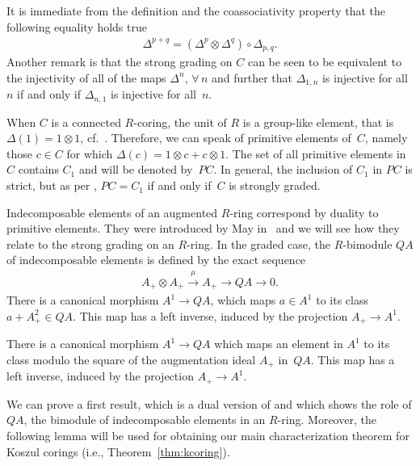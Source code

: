 \documentclass[11pt]{article}
\newcommand\ot{\otimes}
\renewcommand{\^}[1]{\mbox{$^{\left( #1 \right)}$}}
\renewcommand{\_}[1]{\mbox{$_{\left( #1 \right)}$}}
\newcommand\xrar{\xrightarrow}
\numberwithin{equation}{section}
\begin{document}
It is immediate from the def\/inition and the coassociativity property that the following equality holds true
\begin{gather*}
	\Delta^{p+q} = (\Delta^p \ot \Delta^q) \circ \Delta_{p,q}.
\end{gather*}
Another remark is that the strong grading on $C$ can be seen to be equivalent to the injectivity of all of the maps $\Delta^n$, $\forall\, n$ and further that $\Delta_{1,n}$ is injective for all $n$ if and only if $\Delta_{n,1}$ is injective for all~$n$.

When $C$ is a connected $R$-coring, the unit of $R$ is a group-like element, that is $\Delta(1) = 1 \ot 1$, cf.~\cite{jps}. Therefore, we can speak of primitive elements of~$C$, namely those $c \in C$ for which $\Delta(c) = 1 \ot c + c \ot 1$. The set of all primitive elements in $C$ contains $C_1$ and will be denoted by~$PC$. In general, the inclusion of $C_1$ in $PC$ is strict, but as per \cite[Lemma~1.4]{mst}, $PC = C_1$ if and only if~$C$ is strongly graded.

Indecomposable elements of an augmented $R$-ring correspond by duality to primitive elements. They were introduced by May in~\cite{may} and we will see how they relate to the strong grading on an $R$-ring. In the graded case, the $R$-bimodule $QA$ of indecomposable elements is def\/ined by the exact sequence
\begin{gather*} A_+ \ot A_+ \xrar{\mu} A_+ \to QA \to 0.\end{gather*}
There is a canonical morphism $A^1 \to QA$, which maps $a \in A^1$ to its class $a + A_+^2 \in QA$. This map has a left inverse, induced by the projection $A_+ \to A^1$.

There is a canonical morphism $A^1 \to QA$ which maps an element in $A^1$ to its class modulo the square of the augmentation ideal $A_+$ in~$QA$. This map has a left inverse, induced by the projection $A_+ \to A^1$.

We can prove a f\/irst result, which is a dual version of \cite[Lemma~1.4]{mst} and which shows the role of $QA$, the bimodule of indecomposable elements in an $R$-ring. Moreover, the following lemma will be used for obtaining our main characterization theorem for Koszul corings (i.e., Theorem~\ref{thm:kcoring}).
\end{document}
